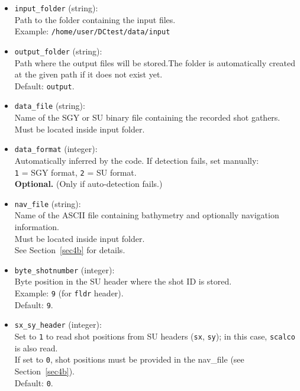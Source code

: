 \documentclass[11pt, oneside]{article}   	%
\begin{document}
\begin{itemize}

\item \texttt{input\_folder} (string):\\
Path to the folder containing the input files.\\
Example: \texttt{/home/user/DCtest/data/input}

\item \texttt{output\_folder} (string):\\
Path where the output files will be stored.The folder is automatically created at the given path if it does not exist yet.\\
Default: \texttt{output}.

\item \texttt{data\_file} (string):\\
Name of the SGY or SU binary file containing the recorded shot gathers.\\
Must be located inside input folder.

\item \texttt{data\_format} (integer):\\
Automatically inferred by the code. If detection fails, set manually:\\
\texttt{1} = SGY format, \texttt{2} = SU format.\\
\textbf{Optional.} (Only if auto-detection fails.)

\item \texttt{nav\_file} (string):\\
Name of the ASCII file containing bathymetry and optionally navigation information.\\
Must be located inside input folder.\\
See Section~\ref{sec4b} for details.

\item \texttt{byte\_shotnumber} (integer):\\
Byte position in the SU header where the shot ID is stored.\\
Example: \texttt{9} (for \texttt{fldr} header).\\
Default: \texttt{9}.

\item \texttt{sx\_sy\_header} (integer):\\
Set to \texttt{1} to read shot positions from SU headers (\texttt{sx}, \texttt{sy}); in this case, \texttt{scalco} is also read.\\
If set to \texttt{0}, shot positions must be provided in the nav\_file (see Section~\ref{sec4b}).\\
Default: \texttt{0}.


\end{itemize}
\end{document}
